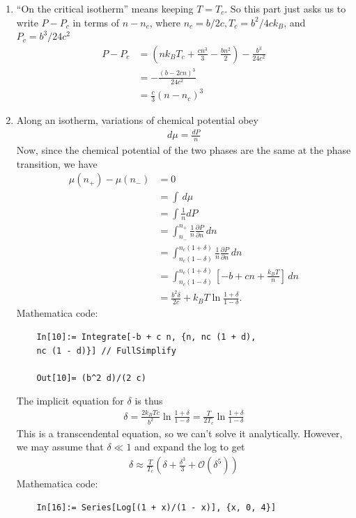 \documentclass{article}
\theoremstyle{definition}
\newcommand{\p}{\partial}
\newcommand{\f}[2]{\frac{#1}{#2}}
\newcommand{\lp}{\left(}
\newcommand{\rp}{\right)}
\newcommand{\lb}{\left[}
\newcommand{\rb}{\right]}
\begin{document}
\begin{enumerate}[label=(\alph*)]
	\item ``On the critical isotherm'' means keeping $T = T_c$. So this part just asks us to write $P-P_c$ in terms of $n-n_c$, where $n_c = b/2c, T_c = b^2/4ck_B$, and $P_c = b^3/24c^2$
	\begin{align*}
	P - P_c &= \lp nk_BT_c + \f{cn^3}{3} - \f{b n^2}{2}\rp - \f{b^3}{24c^2} \\
	&= -\f{(b-2cn)^3}{24c^2} \\
	&= \boxed{\f{c}{3}(n-n_c)^3}
	\end{align*}
	\item Along an isotherm, variations of chemical potential obey
	\begin{align*}
	d\mu = \f{ d P }{n}
	\end{align*}
	Now, since the chemical potential of the two phases are the same at the phase transition, we have
	\begin{align*}
	\mu(n_+) - \mu(n_-) &= 0 \\
	&= \int\,d\mu \\
	&= \int \f{1}{n} dP \\
	&= \int^{n_+}_{n_-} \f{1}{n}\f{\p P}{\p n}\,dn\\
	&= \int^{n_c(1+\delta)}_{n_c(1-\delta)} \f{1}{n}\f{\p P}{\p n}\,dn \\
	&= \int^{n_c(1+\delta)}_{n_c(1-\delta)}\lb -b + cn + \f{k_B T}{n} \rb\,dn \\
	&= \f{b^2\delta}{2c} + k_BT \ln \f{1+\delta}{1-\delta}.
	\end{align*}
	Mathematica code:
	\begin{lstlisting}
	In[10]:= Integrate[-b + c n, {n, nc (1 + d), 
	nc (1 - d)}] // FullSimplify
	
	Out[10]= (b^2 d)/(2 c)
	\end{lstlisting}
	The implicit equation for $\delta$ is thus
	\begin{align*}
	\boxed{\delta} = \f{2k_B Tc}{b^2}\ln \f{1+\delta}{1-\delta} = \boxed{\f{T}{2T_c} \ln \f{1+\delta}{1-\delta} }
	\end{align*}
	This is a transcendental equation, so we can't solve it analytically. However, we may assume that $\delta \ll 1$ and expand the log to get
	\begin{align*}
	\delta \approx \f{T}{T_c}\lp \delta + \f{\delta^3}{3} + \mathcal{O}(\delta^5) \rp
	\end{align*} 
	Mathematica code:
	\begin{lstlisting}
	In[16]:= Series[Log[(1 + x)/(1 - x)], {x, 0, 4}]
	

\end{lstlisting}
\end{enumerate}
\end{document}
